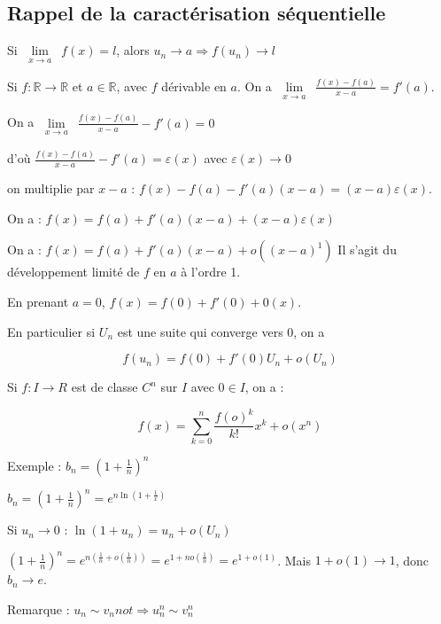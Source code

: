 \documentclass[french]{yLectureNote}
\newcommand{\Lim}[1]{\lim\limits_{\substack{#1}}\:}
\newcommand{\R}[0]{\mathbb{R}}
\begin{document}
\subsection{Rappel de la caractérisation séquentielle}
Si $\Lim{x\to a} f(x) = l$, alors $u_n\to a \Rightarrow f(u_n) \to l$

Si $f : \R \to \R$ et $a\in\R$, avec $f$ dérivable en $a$. On a $\Lim{x\to a} \frac{f(x)-f(a)}{x-a} = f'(a)$.

On a $\Lim{x\to a} \frac{f(x)-f(a)}{x-a} - f'(a) = 0$

d'où $\frac{f(x)-f(a)}{x-a} - f'(a) = \varepsilon(x)$ avec $\varepsilon(x) \to 0$

on multiplie par $x-a$ : $f(x)-f(a) - f'(a)(x-a) = (x-a)\varepsilon(x)$.

On a : $f(x) = f(a)+f'(a)(x-a) + (x-a)\varepsilon(x)$


On a : $f(x) = f(a)+f'(a)(x-a) + o((x-a)^1)$ Il s'agit du développement limité de $f$ en $a$ à l'ordre 1.

En prenant $a=0$, $f(x) = f(0)+ f'(0) + 0(x)$.

En particulier si $U_n$ est une suite qui converge vers $0$, on a

\[f(u_n) = f(0) + f'(0)U_n + o(U_n)\]

\begin{theorem}
 Si $f : I \to R$ est de classe $C^n$ sur $I$ avec $0\in I$, on a :

 \[ f(x) = \sum^n_{k=0} \frac{f(o)^k}{k!}x^k + o(x^n)\]

 Exemple : $b_n = (1+\frac{1}{n})^n$

 $b_n = (1+\frac{1}{n})^n = e^{n\ln(1+\frac{1}{x})}$

 Si $u_n\to 0$ :
 $\ln(1+u_n) = u_n + o(U_n)$

 $(1+\frac{1}{n})^n = e^{n(\frac{1}{n}+o(\frac{1}{n}))} = e^{1+no(\frac{1}{n})} = e^{1 + o(1)}$. Mais $1+o(1) \to 1$, donc $b_n \to e$.

 Remarque : $u_n \sim v_n not \Rightarrow u_n^n \sim v_n^n$
\end{theorem}
\end{document}
